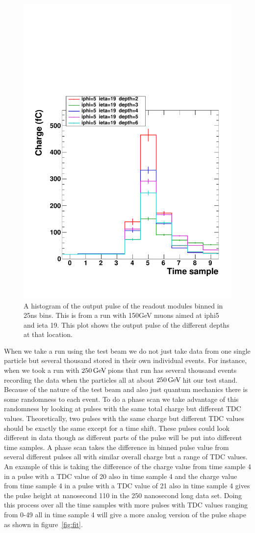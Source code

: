 \begin{figure}
\centering
\includegraphics[width=0.7\linewidth]{Figures/Pulse.pdf}
\caption{A histogram of the output pulse of the readout modules binned in 25ns bins. This is from a run with 150GeV muons aimed at iphi5 and ieta 19. This plot shows the output pulse of the different depths at that location.}
\label{fig:PulSh}
\end{figure}

When we take a run using the test beam we do not just take data from one single particle but several thousand stored in their own individual events. For instance, when we took a run with $250 {\,\text{Ge\hspace{-.08em}V\hspace{-0.16em}}}$ pions that run has several thousand events recording the data when the particles all at about $250 {\,\text{Ge\hspace{-.08em}V\hspace{-0.16em}}}$ hit our test stand. Because of the nature of the test beam and also just quantum mechanics there is some randomness to each event. To do a phase scan we take advantage of this randomness by looking at pulses with the same total charge but different TDC values. Theoretically, two pulses with the same charge but different TDC values should be exactly the same except for a time shift. These pulses could look different in data though as different parts of the pulse will be put into different time samples. A phase scan takes the difference in binned pulse value from several different pulses all with similar overall charge but a range of TDC values. An example of this is taking the difference of the charge value from time sample 4 in a pulse with a TDC value of 20 also in time sample 4 and the charge value from time sample 4 in a pulse with a TDC value of 21 also in time sample 4 gives the pulse height at nanosecond 110 in the 250 nanosecond long data set. Doing this process over all the time samples with more pulses with TDC values ranging from 0-49 all in time sample 4 will give a more analog version of the pulse shape as shown in figure~\ref{fig:fit}.

